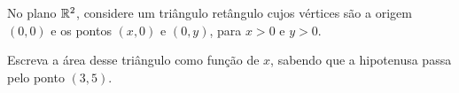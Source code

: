 No plano $\mathbb{R}^2$, considere um triângulo retângulo cujos vértices são a origem $(0,0)$ e os pontos $(x,0)$ e $(0,y)$, para
$x>0$ e $y>0$.

Escreva a área desse triângulo como função de $x$, sabendo que a hipotenusa passa pelo ponto $(3,5)$.
